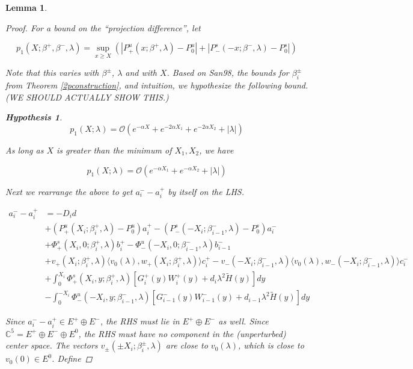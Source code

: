\documentclass[12pt]{article}
\def\C{{\mathbb C}}
\newtheorem{lemma}{Lemma}
\newtheorem{hypothesis}{Hypothesis}
\begin{document}
\begin{lemma}
\begin{proof}
For a bound on the ``projection difference'', let

\[
p_1(X; \beta^+, \beta^-, \lambda) = \sup_{x \geq X} (|P^u_+(x; \beta^+, \lambda) - P_0^u| + |P^s_-(-x; \beta^-, \lambda) - P_0^s|)
\]

Note that this varies with $\beta^\pm$, $\lambda$ and with $X$. Based on San98, the bounds for $\beta_i^\pm$ from Theorem \ref{2pconstruction}, and intuition, we hypothesize the following bound. (WE SHOULD ACTUALLY SHOW THIS.)

\begin{hypothesis}\label{p1bound}
\begin{equation}
p_1(X; \lambda) = \mathcal{O}( e^{-\alpha X} +  e^{-2 \alpha X_1} + e^{-2 \alpha X_2} + |\lambda| )
\end{equation}
\end{hypothesis}

As long as $X$ is greater than the minimum of $X_1, X_2$, we have

\begin{equation}
p_1(X; \lambda) = \mathcal{O}( e^{-\alpha X_1} + e^{-\alpha X_2} + |\lambda| )
\end{equation}

Next we rearrange the above to get $a_i^- - a_i^+$ by itself on the LHS.

\begin{align*}
a_i^- - a_i^+ &= -D_i d  \\
&+ (P^u_+(X_i; \beta_i^+, \lambda) - P_0^u)a_i^+ - (P^s_-(-X_i; \beta_{i-1}^-,\lambda) - P_0^s)a_i^- \\
&+ \Phi^s_+(X_i, 0; \beta_i^+, \lambda)b_i^+ - \Phi^u_-(-X_i, 0; \beta_{i-1}^-, \lambda) b_{i-1}^- \\
&+ v_+(X_i; \beta_i^+, \lambda) \langle v_0(\lambda), w_+(X_i; \beta_i^+, \lambda) \rangle c_i^+ - v_-(-X_i; \beta_{i-1}^-, \lambda) \langle v_0(\lambda), w_-(-X_i; \beta_{i-1}^-, \lambda) \rangle c_i^- \\
&+ \int_0^{X_i} \Phi^s_+(X_i, y; \beta_i^+, \lambda) [ G_i^+(y) W_i^+(y) + d_i \lambda^2 \tilde{H}(y) ] dy \\
&- \int_0^{-X_i} \Phi^u_-(-X_i, y; \beta_{i-1}^-, \lambda) [ G_{i-1}^-(y) W_{i-1}^-(y) + d_{i-1} \lambda^2 \tilde{H}(y) ] dy
\end{align*}

Since $a_i^- - a_i^+ \in E^+ \oplus E^-$, the RHS must lie in $E^+ \oplus E^-$ as well. Since $\C^5 = E^+ \oplus E^- \oplus E^0$, the RHS must have no component in the (unperturbed) center space. The vectors $v_\pm(\pm X_i; \beta_{i}^\pm,\lambda)$ are close to $v_0(\lambda)$, which is close to $v_0(0) \in E^0$. Define


\end{proof}
\end{lemma}
\end{document}
